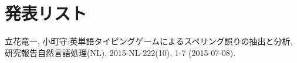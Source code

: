  \newpage

 \section*{\Large 発表リスト}
 \noindent [NL222] 立花竜一, 小町守:英単語タイピングゲームによるスペリング誤りの抽出と分析, 研究報告自然言語処理(NL), 2015-NL-222(10), 1-7 (2015-07-08).